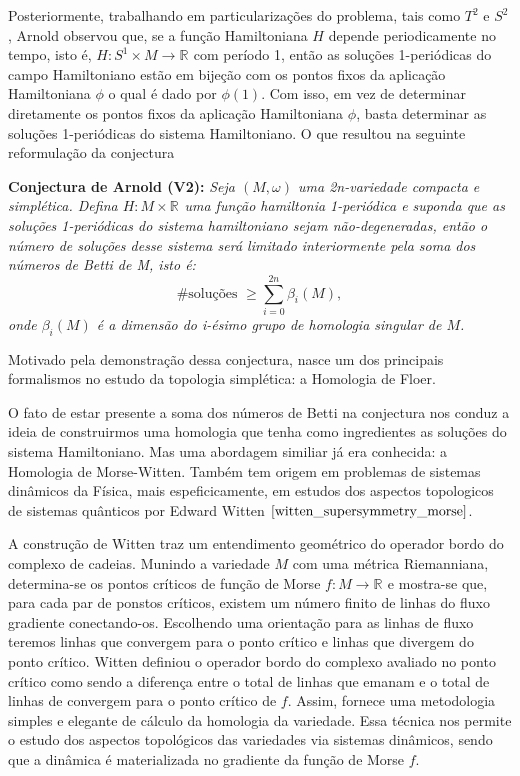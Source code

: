 \documentclass[12pt]{book}
\newcommand{\circulo}{S^{1}}
\newcommand{\circulovariedade}{\circulo\times M}
\newcommand{\real}[1]{\mathbb{R}^{#1}}
\newcommand{\reta}{\real{}}
\begin{document}
	Posteriormente, trabalhando em particularizações do problema, tais como $T^{2}$ e $S^{2}$, Arnold observou que, se a função Hamiltoniana $H$ depende periodicamente no tempo, isto é, $H:\circulovariedade\to \reta$ com período 1, então as soluções 1-periódicas do campo Hamiltoniano estão em bijeção com os pontos fixos da aplicação Hamiltoniana $\phi$ o qual é dado por $\phi(1)$. Com isso, em vez de determinar diretamente os pontos fixos da aplicação Hamiltoniana $\phi$, basta determinar as soluções 1-periódicas do sistema Hamiltoniano. O que resultou na seguinte reformulação da conjectura
	
	\textbf{Conjectura de Arnold (V2):} \textit	{Seja $(M,\omega)$ uma 2n-variedade compacta e simplética. Defina $H:M\times \real{}$ uma função hamiltonia 1-periódica e suponda que as soluções 1-periódicas do sistema hamiltoniano sejam não-degeneradas, então o número de soluções desse sistema será limitado interiormente pela soma dos números de Betti de M, isto é:
		$$
		\#\text{soluções }\geq \sum_{i=0}^{2n}\beta_{i}(M),
		$$
		onde $\beta_{i}(M)$ é a dimensão do i-ésimo grupo de homologia singular de $M$.}
	
	Motivado pela demonstração dessa conjectura, nasce um dos principais formalismos no estudo da topologia simplética: a Homologia de Floer.
	
	O fato de estar presente a soma dos números de Betti na conjectura nos conduz a ideia de construirmos uma homologia que tenha como ingredientes as soluções do sistema Hamiltoniano. Mas uma abordagem similiar já era conhecida: a Homologia de Morse-Witten. Também tem origem em problemas de sistemas dinâmicos da Física, mais espeficicamente, em estudos dos aspectos topologicos de sistemas quânticos por Edward Witten $\cite{witten_supersymmetry_morse}$.
	
	A construção de Witten traz um entendimento geométrico do operador bordo do complexo de cadeias. Munindo a variedade $M$ com uma métrica Riemanniana, determina-se os pontos críticos de função de Morse $f: M \to \reta$ e mostra-se que, para cada par de ponstos críticos, existem um número finito de linhas do fluxo gradiente conectando-os. Escolhendo uma orientação para as linhas de fluxo teremos linhas que convergem para o ponto crítico e linhas que divergem do ponto crítico. Witten definiou o operador bordo do complexo avaliado no ponto crítico como sendo a diferença entre o total de linhas que emanam e o total de linhas de convergem para o ponto crítico de $f$. Assim, fornece uma metodologia simples e elegante de cálculo da homologia da variedade. Essa técnica nos permite o estudo dos aspectos topológicos das variedades via sistemas dinâmicos, sendo que a dinâmica é materializada no gradiente da função de Morse $f$.
	
\end{document}
